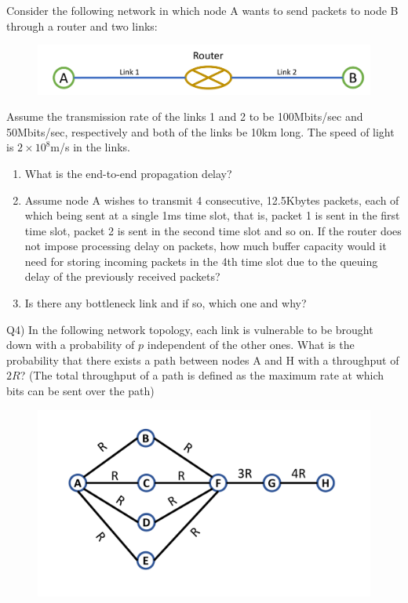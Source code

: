 \documentclass[10pt,letterpaper]{article}
\begin{document}
Consider the following network in which node A wants to send packets to node B through a router and two links:
\begin{figure}[ht]
\Large
\centering
\includegraphics[width=140mm]{p2p}
\end{figure}
Assume the transmission rate of the links 1 and 2 to be 100Mbits/sec and 50Mbits/sec, respectively and both of the links be 10km long. The speed of light is $2\times 10^8$m/s in the links.
\begin{enumerate}[label=\alph*-]
\item
What is the end-to-end propagation delay?
\item
Assume node A wishes to transmit 4 consecutive, 12.5Kbytes packets, each of which being sent at a single 1ms time slot, that is, packet 1 is sent in the first time slot, packet 2 is sent in the second time slot and so on. If the router does not impose processing delay on packets, how much buffer capacity would it need for storing incoming packets in the 4th time slot due to the queuing delay of the previously received packets?
\item
Is there any bottleneck link and if so, which one and why?
\end{enumerate}

Q4) In the following network topology, each link is vulnerable to be brought down with a probability of $p$ independent of the other ones. What is the probability that there exists a path between nodes A and H with a throughput of $2R$? (The total throughput of a path is defined as the maximum rate at which bits can be sent over the path)
\begin{figure}[ht]
\centering
\includegraphics[width=140mm]{Q5}
\end{figure}
\end{document}
